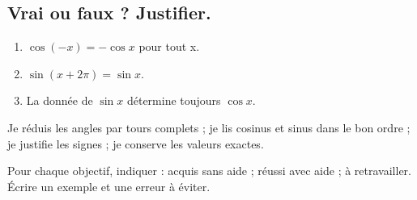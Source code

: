 \subsection*{Vrai ou faux ? Justifier.}\label{C10-VF}
\begin{enumerate}
\item $\cos(-x)=-\cos x$ pour tout x.
\item $\sin(x+2\pi)=\sin x$.
\item La donnée de $\sin x$ détermine toujours $\cos x$.
\end{enumerate}
\begin{keypoint}Je réduis les angles par tours complets ; je lis cosinus et sinus dans le bon ordre ; je justifie les signes ; je conserve les valeurs exactes.

Pour chaque objectif, indiquer : acquis sans aide ; réussi avec aide ; à retravailler. Écrire un exemple et une erreur à éviter.\end{keypoint}
\endgroup
\ifmxteacher{}\fi
